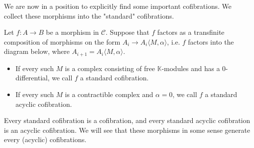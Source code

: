 \documentclass[../thesis.tex]{subfiles}
\begin{document}
            We are now in a position to explicitly find some important cofibrations. We collect these morphisms into the "standard" cofibrations.

            \begin{definition}
                Let $f:A\rightarrow B$ be a morphism in $\mathcal{C}$. Suppose that $f$ factors as a transfinite composition of morphisms on the form $A_i \rightarrow A_i\langle M,\alpha\rangle$, i.e. $f$ factors into the diagram below, where $A_{i+1} = A_i\langle M,\alpha\rangle$.
                \begin{center}
                \end{center}
                \begin{itemize}
                    \item If every such $M$ is a complex consisting of free $\mathbb{K}$-modules and has a $0$-differential, we call $f$ a standard cofibration.
                    \item If every such $M$ is a contractible complex and $\alpha = 0$, we call $f$ a standard acyclic cofibration.
                \end{itemize}
            \end{definition}

            \begin{proposition}
                Every standard cofibration is a cofibration, and every standard acyclic cofibration is an acyclic cofibration. We will see that these morphisms in some sense generate every (acyclic) cofibrations.
            \end{proposition}
\end{document}
